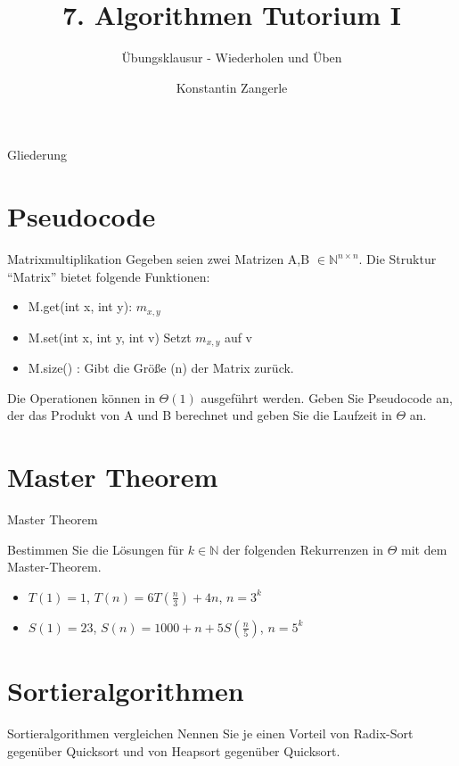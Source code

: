 \documentclass[18pt]{beamer}
\title[Algo I Tut]{7. Algorithmen Tutorium I}
\subtitle{Übungsklausur - Wiederholen und Üben}
\author[Zangerle]{Konstantin Zangerle}
\institute{Institut für Theoretische Informatik}
\newcommand{\N}{\mathbb{N}}
\begin{document}

\begin{frame}
\titlepage
\end{frame}

\begin{frame}{Gliederung}
 \tableofcontents
\end{frame}


\section{Pseudocode}
\begin{frame}{Matrixmultiplikation}
 Gegeben seien zwei Matrizen A,B $\in \N^{n \times n}$.
 Die Struktur ``Matrix'' bietet folgende Funktionen:
 \begin{itemize}
  \item M.get(int x, int y): $m_{x,y}$
  \item M.set(int x, int y, int v) Setzt $m_{x,y}$ auf v
  \item M.size() : Gibt die Größe (n) der Matrix zurück.
 \end{itemize}
Die Operationen können in $\Theta(1)$ ausgeführt werden.
Geben Sie Pseudocode an, der das Produkt von A und B berechnet 
und geben Sie die Laufzeit in $\Theta$ an.

\end{frame}

\section{Master Theorem}
\begin{frame}{Master Theorem}

Bestimmen Sie die Lösungen für $k \in \N$ der folgenden Rekurrenzen in $\Theta$ mit dem Master-Theorem.
\begin{itemize}
 \item $T(1) = 1$, $T(n) = 6 T(\frac{n}{3}) + 4n$, $n = 3^k$
 \item $S(1) = 23$, $S(n) = 1000 + n + 5S(\frac{n}{5})$, $n = 5^k$
\end{itemize}
 
\end{frame}


\section{Sortieralgorithmen}
\begin{frame}{Sortieralgorithmen vergleichen}
 Nennen Sie je einen Vorteil von Radix-Sort gegenüber 
 Quicksort und von Heapsort gegenüber Quicksort.
\end{frame}
\end{document}
